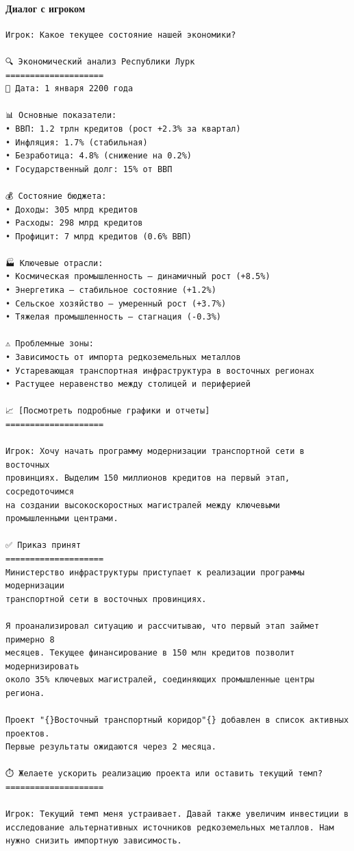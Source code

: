 \paragraph{Диалог с игроком}

\begin{verbatim}
Игрок: Какое текущее состояние нашей экономики?

🔍 Экономический анализ Республики Лурк
====================
📅 Дата: 1 января 2200 года

📊 Основные показатели:
• ВВП: 1.2 трлн кредитов (рост +2.3% за квартал)
• Инфляция: 1.7% (стабильная)
• Безработица: 4.8% (снижение на 0.2%)
• Государственный долг: 15% от ВВП

💰 Состояние бюджета:
• Доходы: 305 млрд кредитов
• Расходы: 298 млрд кредитов
• Профицит: 7 млрд кредитов (0.6% ВВП)

🏭 Ключевые отрасли:
• Космическая промышленность — динамичный рост (+8.5%)
• Энергетика — стабильное состояние (+1.2%)
• Сельское хозяйство — умеренный рост (+3.7%)
• Тяжелая промышленность — стагнация (-0.3%)

⚠️ Проблемные зоны:
• Зависимость от импорта редкоземельных металлов
• Устаревающая транспортная инфраструктура в восточных регионах
• Растущее неравенство между столицей и периферией

📈 [Посмотреть подробные графики и отчеты]
====================

Игрок: Хочу начать программу модернизации транспортной сети в восточных
провинциях. Выделим 150 миллионов кредитов на первый этап, сосредоточимся
на создании высокоскоростных магистралей между ключевыми
промышленными центрами.

✅ Приказ принят
====================
Министерство инфраструктуры приступает к реализации программы модернизации
транспортной сети в восточных провинциях.

Я проанализировал ситуацию и рассчитываю, что первый этап займет примерно 8
месяцев. Текущее финансирование в 150 млн кредитов позволит модернизировать
около 35% ключевых магистралей, соединяющих промышленные центры региона.

Проект "{}Восточный транспортный коридор"{} добавлен в список активных проектов.
Первые результаты ожидаются через 2 месяца.

⏱️ Желаете ускорить реализацию проекта или оставить текущий темп?
====================

Игрок: Текущий темп меня устраивает. Давай также увеличим инвестиции в
исследование альтернативных источников редкоземельных металлов. Нам
нужно снизить импортную зависимость.


\end{verbatim}
